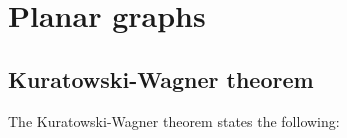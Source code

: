 \documentclass{article}
\author{Eric Luu}
\begin{document}
\section{Planar graphs}

\subsection{Kuratowski-Wagner theorem}
The Kuratowski-Wagner theorem \cite{kuratowskiProblemeCourbesGauches1930} states the following:

\printbibliography
\end{document}
